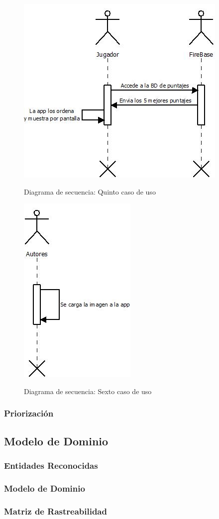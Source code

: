 \begin{figure}[htbp]
\centering
   \includegraphics[scale=0.9]{imgs/DS_5.jpeg}
   \begin{center}
   Diagrama de secuencia: Quinto caso de uso
   \end{center}
\end{figure}

\begin{figure}[htbp]
\centering
   \includegraphics[scale=0.9]{imgs/DS_6.jpeg}
   \begin{center}
   Diagrama de secuencia: Sexto caso de uso
   \end{center}
\end{figure}
\subsubsection{Priorización}

\subsection{Modelo de Dominio}
\subsubsection{Entidades Reconocidas}
\subsubsection{Modelo de Dominio}
\subsubsection{Matriz de Rastreabilidad}